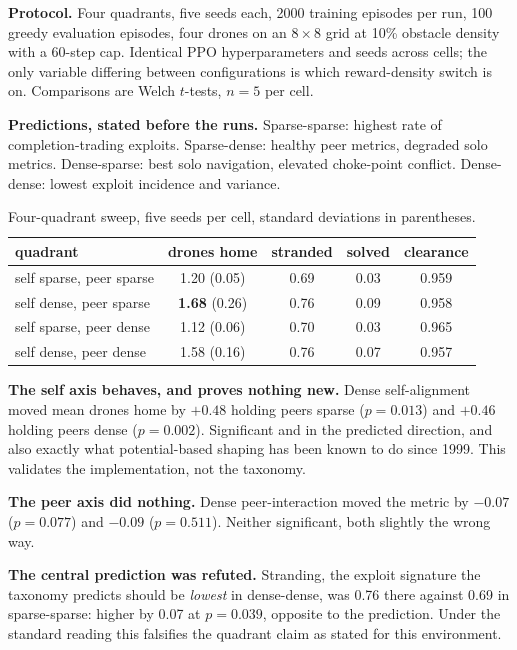 \documentclass[11pt]{article}
\begin{document}
\textbf{Protocol.} Four quadrants, five seeds each, 2000 training episodes per run, 100 greedy evaluation episodes, four drones on an $8\times8$ grid at 10\% obstacle density with a 60-step cap. Identical PPO hyperparameters and seeds across cells; the only variable differing between configurations is which reward-density switch is on. Comparisons are Welch $t$-tests, $n=5$ per cell.

\textbf{Predictions, stated before the runs.} Sparse-sparse: highest rate of completion-trading exploits. Sparse-dense: healthy peer metrics, degraded solo metrics. Dense-sparse: best solo navigation, elevated choke-point conflict. Dense-dense: lowest exploit incidence and variance.

\begin{table}[h]
\centering\small
\begin{tabular}{lcccc}
\toprule
quadrant & drones home & stranded & solved & clearance \\
\midrule
self sparse, peer sparse & 1.20 (0.05) & 0.69 & 0.03 & 0.959 \\
self dense, peer sparse & \textbf{1.68} (0.26) & 0.76 & 0.09 & 0.958 \\
self sparse, peer dense & 1.12 (0.06) & 0.70 & 0.03 & 0.965 \\
self dense, peer dense & 1.58 (0.16) & 0.76 & 0.07 & 0.957 \\
\bottomrule
\end{tabular}
\caption{Four-quadrant sweep, five seeds per cell, standard deviations in parentheses.}
\end{table}

\textbf{The self axis behaves, and proves nothing new.} Dense self-alignment moved mean drones home by $+0.48$ holding peers sparse ($p=0.013$) and $+0.46$ holding peers dense ($p=0.002$). Significant and in the predicted direction, and also exactly what potential-based shaping has been known to do since 1999. This validates the implementation, not the taxonomy.

\textbf{The peer axis did nothing.} Dense peer-interaction moved the metric by $-0.07$ ($p=0.077$) and $-0.09$ ($p=0.511$). Neither significant, both slightly the wrong way.

\textbf{The central prediction was refuted.} Stranding, the exploit signature the taxonomy predicts should be \emph{lowest} in dense-dense, was 0.76 there against 0.69 in sparse-sparse: higher by 0.07 at $p=0.039$, opposite to the prediction. Under the standard reading this falsifies the quadrant claim as stated for this environment.
\end{document}
